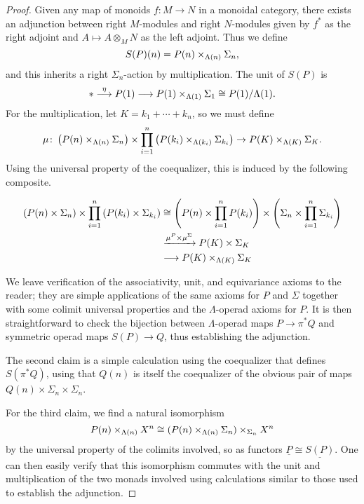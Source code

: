 \begin{proof}
Given any map of monoids $f \colon M \rightarrow N$ in a monoidal category, there exists an adjunction between right $M$-modules and right $N$-modules given by $f^{*}$ as the right adjoint and $A \mapsto A \otimes_{M} N$ as the left adjoint. Thus we define
  \[
    S(P)(n) = P(n) \times_{\Lambda(n)} \Sigma_{n},
  \]
and this inherits a right $\Sigma_{n}$-action by multiplication. The unit of $S(P)$ is
  \[
    * \stackrel{\eta}{\longrightarrow} P(1) \longrightarrow P(1) \times_{\Lambda(1)} \Sigma_{1} \cong P(1)/\Lambda(1).
  \]
For the multiplication, let $K = k_1 + \cdots + k_n$, so we must define
  \[
    \mu \colon \left(P(n) \times_{\Lambda(n)} \Sigma_{n}\right) \times \prod_{i=1}^n \left(P(k_i) \times_{\Lambda(k_i)} \Sigma_{k_i}\right) \rightarrow P(K) \times_{\Lambda(K)} \Sigma_{K}.
  \]
Using the universal property of the coequalizer, this is induced by the following composite.

  \begin{align*}
    (P(n) \times \Sigma_{n}) \times \prod_{i=1}^n \left(P(k_i) \times \Sigma_{k_i}\right) &\cong \left(P(n) \times \prod_{i=1}^n P(k_{i}) \right) \times \left(\Sigma_{n} \times \prod_{i=1}^n \Sigma_{k_{i}} \right)\\
    &\xrightarrow{\mu^P \times \mu^{\Sigma}} P(K) \times \Sigma_{K}\\
    &\longrightarrow  P(K) \times_{\Lambda(K)} \Sigma_{K}
  \end{align*}

We leave verification of the associativity, unit, and equivariance axioms to the reader; they are simple applications of the same axioms for $P$ and $\Sigma$ together with some colimit universal properties and the $\Lambda$-operad axioms for $P$. It is then straightforward to check the bijection between $\Lambda$-operad maps $P \rightarrow \pi^{*}Q$ and symmetric operad maps $S(P) \rightarrow Q$, thus establishing the adjunction.

The second claim is a simple calculation using the coequalizer that defines $S(\pi^{*}Q)$, using that $Q(n)$ is itself the coequalizer of the obvious pair of maps $Q(n) \times \Sigma_{n} \times \Sigma_{n}$.

For the third claim, we find a natural isomorphism
  \[
    P(n) \times_{\Lambda(n)} X^{n} \cong (P(n) \times_{\Lambda(n)} \Sigma_{n}) \times_{\Sigma_{n}} X^{n}
  \]
by the universal property of the colimits involved, so as functors $\underline{P} \cong \underline{S(P)}$. One can then easily verify that this isomorphism commutes with the unit and multiplication of the two monads involved using calculations similar to those used to establish the adjunction.
\end{proof}


